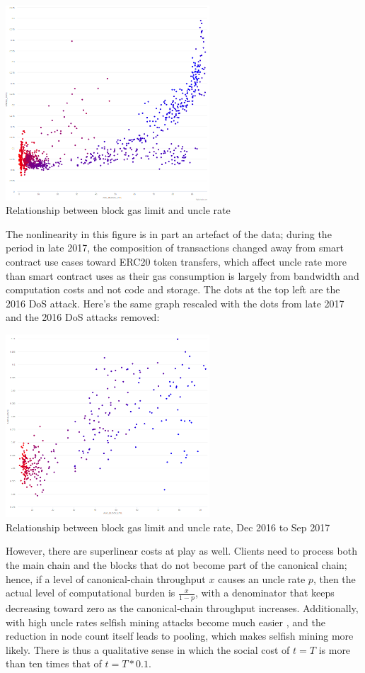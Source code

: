 \documentclass[12pt, final]{article}
\begin{document}
\begin{center}
\includegraphics[width=3in]{etherchain_correlation.png} \\
Relationship between block gas limit and uncle rate
\label{fig:three}
\end{center}

The nonlinearity in this figure is in part an artefact of the data; during the period in late 2017, the composition of transactions changed away from smart contract use cases toward ERC20 token transfers, which affect uncle rate more than smart contract uses as their gas consumption is largely from bandwidth and computation costs and not code and storage. The dots at the top left are the 2016 DoS attack. Here's the same graph rescaled with the dots from late 2017 and the 2016 DoS attacks removed:

\begin{center}
\includegraphics[width=3in]{etherchain_correlation_2.png} \\
Relationship between block gas limit and uncle rate, Dec 2016 to Sep 2017
\label{fig:three}
\end{center}

However, there are superlinear costs at play as well. Clients need to process both the main chain and the blocks that do not become part of the canonical chain; hence, if a level of canonical-chain throughput $x$ causes an uncle rate $p$, then the actual level of computational burden is $\frac{x}{1-p}$, with a denominator that keeps decreasing toward zero as the canonical-chain throughput increases. Additionally, with high uncle rates selfish mining attacks become much easier , and the reduction in node count itself leads to pooling, which makes selfish mining more likely. There is thus a qualitative sense in which the social cost of $t = T$ is more than ten times that of $t = T * 0.1$.
\end{document}
